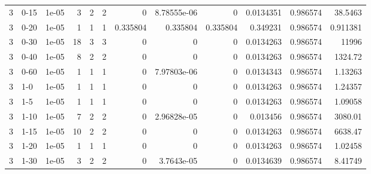 \begin{tabular}{rlrrrrrrrrrr}
     3 & 0-15   &      1e-05 &           3 &                 2 &                 2 &     0           &     8.78555e-06 &      0           &        0.0134351 &               0.986574 &          38.5463   \\
     3 & 0-20   &      1e-05 &           1 &                 1 &                 1 &     0.335804    &     0.335804    &      0.335804    &        0.349231  &               0.986574 &           0.911381 \\
     3 & 0-30   &      1e-05 &          18 &                 3 &                 3 &     0           &     0           &      0           &        0.0134263 &               0.986574 &       11996        \\
     3 & 0-40   &      1e-05 &           8 &                 2 &                 2 &     0           &     0           &      0           &        0.0134263 &               0.986574 &        1324.72     \\
     3 & 0-60   &      1e-05 &           1 &                 1 &                 1 &     0           &     7.97803e-06 &      0           &        0.0134343 &               0.986574 &           1.13263  \\
     3 & 1-0    &      1e-05 &           1 &                 1 &                 1 &     0           &     0           &      0           &        0.0134263 &               0.986574 &           1.24357  \\
     3 & 1-5    &      1e-05 &           1 &                 1 &                 1 &     0           &     0           &      0           &        0.0134263 &               0.986574 &           1.09058  \\
     3 & 1-10   &      1e-05 &           7 &                 2 &                 2 &     0           &     2.96828e-05 &      0           &        0.013456  &               0.986574 &        3080.01     \\
     3 & 1-15   &      1e-05 &          10 &                 2 &                 2 &     0           &     0           &      0           &        0.0134263 &               0.986574 &        6638.47     \\
     3 & 1-20   &      1e-05 &           1 &                 1 &                 1 &     0           &     0           &      0           &        0.0134263 &               0.986574 &           1.02458  \\
     3 & 1-30   &      1e-05 &           3 &                 2 &                 2 &     0           &     3.7643e-05  &      0           &        0.0134639 &               0.986574 &           8.41749  \\

\end{tabular}
